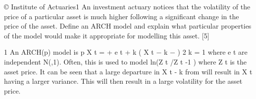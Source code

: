 \documentclass[a4paper,12pt]{article}
\begin{document}
© Institute of Actuaries1
An investment actuary notices that the volatility of the price of a particular asset is
much higher following a significant change in the price of the asset.
Define an ARCH model and explain what particular properties of the model would
make it appropriate for modelling this asset.
[5]



1
An ARCH(p) model is
p
X t = \mu + e t \alpha \theta  + \sum  \alpha k ( X t − k − \mu ) 2
k = 1
where e t are independent N(\theta ,1).
Often, this is used to model ln(Z t /Z t -1 ) where Z t is the asset price.
It can be seen that a large departure in X t - k from \mu will result in X t having a larger
variance. This will then result in a large volatility for the asset price.
\end{document}
